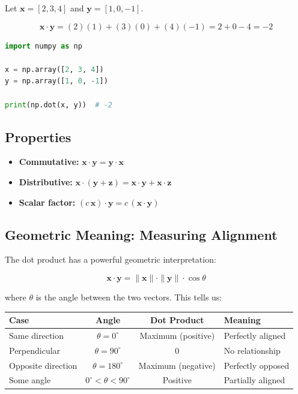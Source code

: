 \documentclass[11pt,a4paper]{article}
\begin{document}
Let $\mathbf{x} = [2, 3, 4]$ and $\mathbf{y} = [1, 0, -1]$.

\[
\mathbf{x} \cdot \mathbf{y} = (2)(1) + (3)(0) + (4)(-1) = 2 + 0 - 4 = -2
\]

\begin{lstlisting}[language=Python]
import numpy as np

x = np.array([2, 3, 4])
y = np.array([1, 0, -1])

print(np.dot(x, y))  # -2
\end{lstlisting}

\subsection{Properties}

\begin{itemize}[leftmargin=1.5em]
    \item \textbf{Commutative:} $\mathbf{x} \cdot \mathbf{y} = \mathbf{y} \cdot \mathbf{x}$
    \item \textbf{Distributive:} $\mathbf{x} \cdot (\mathbf{y} + \mathbf{z}) = \mathbf{x} \cdot \mathbf{y} + \mathbf{x} \cdot \mathbf{z}$
    \item \textbf{Scalar factor:} $(c\,\mathbf{x}) \cdot \mathbf{y} = c\,(\mathbf{x} \cdot \mathbf{y})$
\end{itemize}

\subsection{Geometric Meaning: Measuring Alignment}

The dot product has a powerful geometric interpretation:

\begin{equation}
\mathbf{x} \cdot \mathbf{y} = \|\mathbf{x}\| \cdot \|\mathbf{y}\| \cdot \cos\theta
\end{equation}

where $\theta$ is the angle between the two vectors. This tells us:

\begin{center}
\renewcommand{\arraystretch}{1.4}
\begin{tabular}{@{}lccl@{}}
\toprule
\textbf{Case} & \textbf{Angle} & \textbf{Dot Product} & \textbf{Meaning} \\
\midrule
Same direction & $\theta = 0^\circ$ & Maximum (positive) & Perfectly aligned \\
Perpendicular & $\theta = 90^\circ$ & 0 & No relationship \\
Opposite direction & $\theta = 180^\circ$ & Maximum (negative) & Perfectly opposed \\
Some angle & $0^\circ < \theta < 90^\circ$ & Positive & Partially aligned \\
\bottomrule
\end{tabular}
\end{center}
\end{document}
